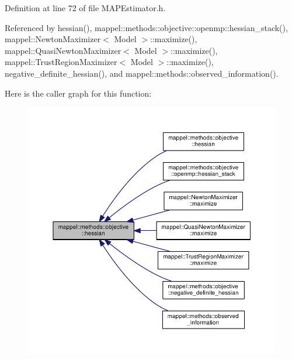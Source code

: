 Definition at line 72 of file M\+A\+P\+Estimator.\+h.



Referenced by hessian(), mappel\+::methods\+::objective\+::openmp\+::hessian\+\_\+stack(), mappel\+::\+Newton\+Maximizer$<$ Model $>$\+::maximize(), mappel\+::\+Quasi\+Newton\+Maximizer$<$ Model $>$\+::maximize(), mappel\+::\+Trust\+Region\+Maximizer$<$ Model $>$\+::maximize(), negative\+\_\+definite\+\_\+hessian(), and mappel\+::methods\+::observed\+\_\+information().



Here is the caller graph for this function\+:\nopagebreak
\begin{figure}[H]
\begin{center}
\leavevmode
\includegraphics[width=350pt]{namespacemappel_1_1methods_1_1objective_afbf93fa446606620d01747af3684f62d_icgraph}
\end{center}
\end{figure}


